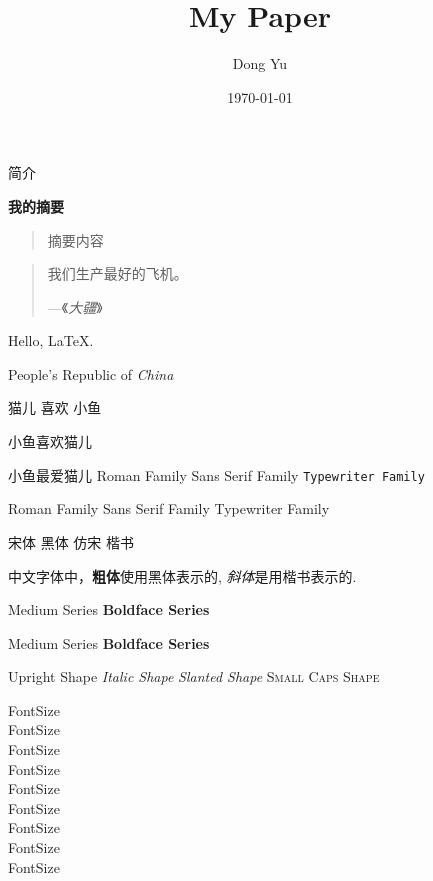\documentclass[12pt]{article} %
\title{My Paper}
\author{Dong Yu}
\date{\today}
\newcommand{\PRC}{People's Republic of \emph{China}}
\newcommand{\loves}[2]{#2 喜欢 #1}
\newcommand{\likes}[3][喜欢]{#2#1#3} %
\renewcommand\abstractname{简介}
\newenvironment{myabstract}[1][摘要]%
{\small
	\begin{center}\bfseries #1\end{center}
	\begin{quotation}}%
{\end{quotation}}
\newenvironment{Quotation}[1]{
	\newcommand{\quotesource}{#1}
	\begin{quotation}}
	{\par\hfill---《\textit{\quotesource}》\end{quotation}}
\begin{document}
	
	\maketitle
	
	\abstractname					%
	
	\begin{myabstract}[我的摘要]	%
		摘要内容
	\end{myabstract} 

	\begin{Quotation}{大疆}
		我们生产最好的飞机。
	\end{Quotation}
	
	Hello, \LaTeX.
	
	\PRC
	
	\loves{小鱼}{猫儿}
	
	\likes{小鱼}{猫儿}
	
	\likes[最爱]{小鱼}{猫儿}	%
	\textrm{Roman Family}	%
	\textsf{Sans Serif Family}	%
	\texttt{Typewriter Family}	%
	
	{\rmfamily Roman Family }
	{\sffamily Sans Serif Family} %
	{\ttfamily Typewriter Family}
	
	{\songti 宋体}
	{\heiti 黑体}
	{\fangsong 仿宋}
	{\kaishu 楷书}
	
	中文字体中，\textbf{粗体}使用黑体表示的, \textit{斜体}是用楷书表示的.
	
	\textmd{Medium Series} %
	\textbf{Boldface Series} %
	
	{\mdseries Medium Series} {\bfseries Boldface Series}
	
	\textup{Upright Shape}	%
	\textit{Italic Shape}	%
	\textsl{Slanted Shape}	%
	\textsc{Small Caps Shape} %
	
	
	{\tiny FontSize}\\
	{\scriptsize FontSize}\\
	{\footnotesize FontSize}\\
	{\small FontSize}\\
	{\normalsize FontSize}\\
	{\large FontSize}\\
	{\Large FontSize}\\
	{\huge FontSize}\\
	{\Huge FontSize}\\
	
\end{document}
